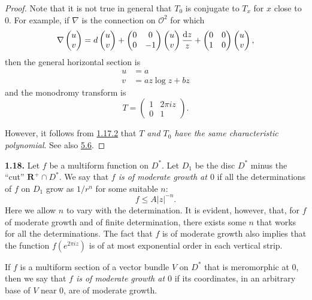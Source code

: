\documentclass{report}
\newenvironment{rmenv}[1]
  {\phantomsection\par\medskip\noindent\textbf{#1.}\rmfamily}
  {\par\medskip}
\renewcommand{\cal}[1]{{\mathcal{#1}}}
\newcommand{\dd}{\mathrm{d}}
\newcommand{\RR}{\mathbf{R}}
\renewcommand{\leq}{\leqslant}
\newcommand{\oldpage}[1]{\marginpar{\footnotesize$\Big\vert$ \textit{p.~#1}}}
\begin{document}
\begin{proof}
  Note that it is not true in general that $T_0$ is conjugate to $T_x$ for $x$ close to $0$.
  For example, if $\nabla$ is the connection on $\cal{O}^2$ for which
  \[
    \nabla\begin{pmatrix}u\\v\end{pmatrix}
    = \\d\begin{pmatrix}u\\v\end{pmatrix} + \begin{pmatrix}0&0\\0&-1\end{pmatrix}\begin{pmatrix}u\\v\end{pmatrix}\frac{\dd z}{z} + \begin{pmatrix}0&0\\1&0\end{pmatrix}\begin{pmatrix}u\\v\end{pmatrix},
  \]
  then the general horizontal section is
\oldpage{55}
  \[
    \begin{aligned}
      u &= a
    \\v &= az\log z+bz
    \end{aligned}
  \]
  and the monodromy transform is
  \[
    T = \begin{pmatrix}1&2\pi iz\\0&1\end{pmatrix}.
  \]

  However, it follows from \hyperref[II.1.17.2]{1.17.2} that \emph{$T$ and $T_0$ have the same characteristic polynomial}.
  See also \hyperref[II.5.6]{5.6}.
\end{proof}

\begin{rmenv}{1.18}
\label{II.1.18}
  Let $f$ be a multiform function on $D^*$.
  Let $D_1$ be the disc $D^*$ minus the ``cut'' $\RR^+\cap D^*$.
  We say that \emph{$f$ is of moderate growth at $0$} if all the determinations of $f$ on $D_1$ grow as $1/r^n$ for some suitable $n$:
  \[
    f \leq A|z|^{-n}.
  \]
  Here we allow $n$ to vary with the determination.
  It is evident, however, that, for $f$ of moderate growth and of finite determination, there exists some $n$ that works for all the determinations.
  The fact that $f$ is of moderate growth also implies that the function $f(e^{2\pi iz})$ is of at most exponential order in each vertical strip.

  If $f$ is a multiform section of a vector bundle $V$ on $D^*$ that is meromorphic at $0$, then we say that \emph{$f$ is of moderate growth at $0$} if its coordinates, in an arbitrary base of $V$ near $0$, are of moderate growth.
\end{rmenv}
\end{document}
